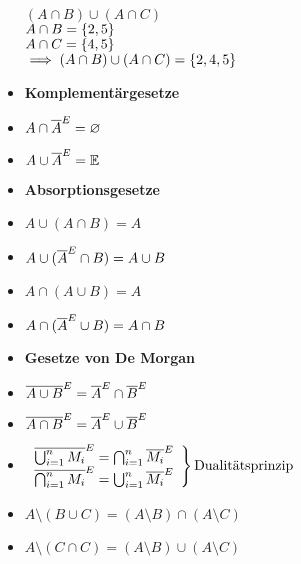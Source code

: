 \begin{itemize}[leftmargin=*]
\begin{minipage}{0.5\columnwidth}
                        ~ \\
                        $(A \cap B) \cup (A \cap C)$ \\
                        $A \cap B = \{ 2, 5 \}$ \\
                        $A \cap C = \{ 4, 5 \}$ \\
                        $\implies (A \cap B) \cup (A \cap C) = \{ 2, 4, 5 \}$
                    \end{minipage}
                \item \textbf{Komplementärgesetze} 
                \item[] $A \cap \overline{A}^E = \varnothing$ 
                \item[] $A \cup \overline{A}^E = \mathbb{E}$ 
                \item \textbf{Absorptionsgesetze}
                \item[] $A \cup (A \cap B) = A $
                \item[] $A \cup (\overline{A}^E \cap B) = A \cup B $
                \item[] $A \cap (A \cup B) = A $
                \item[] $A \cap (\overline{A}^E \cup B) = A \cap B $
                \item \textbf{Gesetze von De Morgan} 
                \item[] $\overline{A \cup B}^E = \overline{A}^E \cap \overline{B}^E$
                \item[] $\overline{A \cap B}^E = \overline{A}^E \cup \overline{B}^E$
                \item[] $ \left.
                    \begin{array}{c}  \komplement{\bigcup_{i=1}^n M_i} = \bigcap_{i=1}^n \komplement{M_i} \\
                                \komplement{\bigcap_{i=1}^n M_i} = \bigcup_{i=1}^n \komplement{M_i} \\
                    \end{array}%
                     \right\} \text{Dualitätsprinzip} $ %
                \item[] $A \setminus (B \cup C) = (A \setminus B) \cap (A \setminus C)$
                \item[] $A \setminus (C \cap C) = (A \setminus B) \cup (A \setminus C)$
                \end{itemize}
